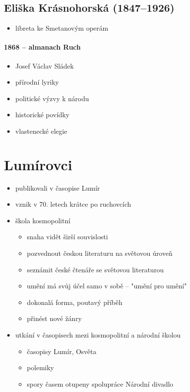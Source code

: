 \subsection{Eliška Krásnohorská (1847--1926)}
\begin{itemize}
\item libreta ke Smetanovým operám
\end{itemize}

\paragraph{1868 -- almanach Ruch}
\begin{itemize}
\item Josef Václav Sládek
\item přírodní lyriky
\item politické výzvy k národu
\item historické povídky
\item vlastenecké elegie
\end{itemize}

\section{Lumírovci}
\begin{itemize}
\item publikovali v časopise Lumír
\item vznik v 70. letech krátce po ruchovcích
\item škola kosmopolitní
	\begin{itemize}
	\item snaha vidět širší souvislosti
	\item pozvednout českou literaturu na světovou úroveň
	\item seznámit české čtenáře se světovou literaturou
	\item umění má svůj účel samo v sobě -- "umění pro umění"
	\item dokonalá forma, poutavý příběh
	\item přinést nové žánry
	\end{itemize}
\item utkání v časopisech mezi kosmopolitní a národní školou
	\begin{itemize}
	\item časopisy Lumír, Osvěta
	\item polemiky
	\item spory časem otupeny \ra spolupráce \ra Národní divadlo
	\end{itemize}
\end{itemize}

